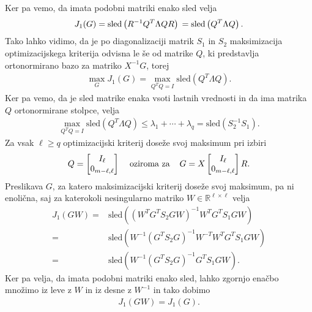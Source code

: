 \documentclass[mat1]{article}
\theoremstyle{definition}
\begin{document}
Ker pa vemo, da imata podobni matriki enako sled velja
\begin{equation}
J_1(G)
=
\text{sled} \left( R^{-1} Q^T \Lambda QR \right)
\nonumber \\
=
\text{sled} \left(Q^T \Lambda Q \right)
\text{.}
\end{equation}
Tako lahko vidimo, da je po diagonalizaciji matrik $S_1$ in $S_2$ maksimizacija optimizacijskega kriterija odvisna le še od matrike $Q$, ki predstavlja ortonormirano bazo za matriko $X^{-1} G$, torej
\begin{align*}
\max_G J_1(G) = \max_{Q^TQ=I} \text{sled} \left(Q^T \Lambda Q \right)
\text{.}
\end{align*}
Ker pa vemo, da je sled matrike enaka vsoti lastnih vrednosti in da ima matrika $Q$ ortonormirane stolpce, velja
\begin{align*}
\max_{Q^TQ=I} \text{sled} \left(Q^T \Lambda Q \right)
\leq
\lambda_1 + \cdots + \lambda_q
=
\text{sled} \left( S_2^{-1} S_1 \right)
\text{.}
\end{align*}
Za vsak $\ell \geq q$ optimizacijski kriterij doseže svoj maksimum pri izbiri
$$ Q = 
\begin{bmatrix}
I_{\ell} \\
0_{m-\ell, \ell}
\end{bmatrix}
\hspace{4mm}
\text{oziroma za}
\hspace{4mm}
G = 
X
\begin{bmatrix}
I_{\ell} \\
0_{m-\ell, \ell}
\end{bmatrix}
R
\text{.}
$$
Preslikava $G$, za katero maksimizacijski kriterij doseže svoj maksimum, pa ni enolična, saj za katerokoli nesingularno matriko $W \in \mathbb{R}^{\ell \times \ell}$ velja
\begin{equation}
\begin{split}
J_1(GW) =& 
\text{sled}\left( (W^T G^T S_2 G W)^{-1} W^T G^T S_1 GW \right)
\\
=&
\text{sled}\left( W^{-1}(G^T S_2 G)^{-1}W^{-T} W^T G^T S_1 GW \right)
\\
=&
\text{sled}\left( W^{-1}(G^T S_2 G)^{-1}G^T S_1 GW \right)
\text{.}
\nonumber
\end{split}
\end{equation}
Ker pa velja, da imata podobni matriki enako sled, lahko zgornjo enačbo množimo iz leve z $W$ in iz desne z $W^{-1}$ in tako dobimo
\begin{align*}
J_1(GW)
=
J_1(G)
\text{.}
\end{align*}
\end{document}

